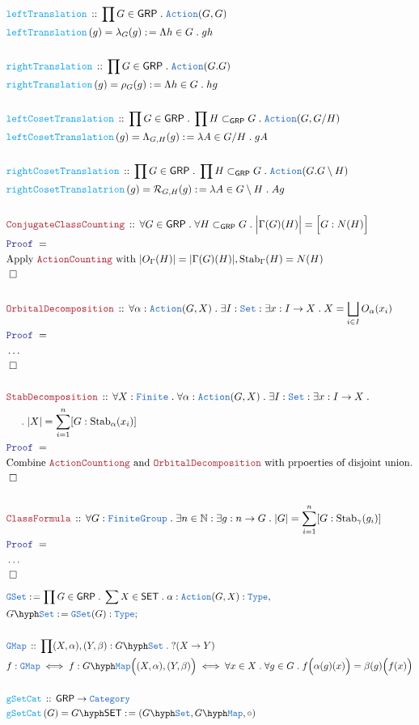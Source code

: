 \documentclass[12pt]{scrartcl}
\newcommand{\TYPE}[1]{\textcolor{NavyBlue}{\mathtt{#1}}}
\newcommand{\FUNC}[1]{\textcolor{Cerulean}{\mathtt{#1}}}
\newcommand{\LOGIC}[1]{\textcolor{Blue}{\mathtt{#1}}}
\newcommand{\THM}[1]{\textcolor{Maroon}{\mathtt{#1}}}
\renewcommand{\.}{\; . \;}
\newcommand{\de}{: \kern 0.1pc =}
\newcommand{\Act}[1]{\left( #1 \right)}
\newcommand{\Theorem}[2]{& \THM{#1} \, :: \, #2 \\ & \Proof = \\ }
\newcommand{\DeclareType}[2]{& \TYPE{#1} \, :: \, #2 \\}
\newcommand{\DefineNamedType}[4]{& #1 : \TYPE{#2} \iff #3 \iff #4 \\}
\newcommand{\DeclareFunc}[2]{& \FUNC{#1} \, :: \, #2 \\}
\newcommand{\DefineNamedFunc}[4]{&  \FUNC{#1}\Act{#2} = #3 \de #4 \\}
\newcommand{\NewLine}{\\ & \kern 1pc}
\newcommand{\Page}[1]{ \begin{align*} #1 \end{align*}   }
\newcommand{\NoProof}{ & \ldots \\ \EndProof}
\newcommand{\Type}{\TYPE{Type}}
\newcommand{\Nat}{\mathbb{N} }
\newcommand{\Cat}{\TYPE{Category}}
\newcommand{\Set}{\TYPE{Set}}
\newcommand{\Say}[3]{& #1 \de #2 : #3, \\}
\newcommand{\Conclude}[3]{& #1 \de #2 : #3; \\}
\newcommand{\QED}{\; \square}
\newcommand{\EndProof}{& \QED \\}
\newcommand{\Proof}{\LOGIC{Proof} \; }
\newcommand{\SET}{\mathsf{SET}}
\newcommand{\Sgrp}{\subset_{\mathsf{GRP}}}
\newcommand{\FG}{\TYPE{FiniteGroup}}
\newcommand{\Stab}{\mathrm{Stab}}
\newcommand{\GRP}{\mathsf{GRP}}
\begin{document}
\Page{
	\DeclareFunc{leftTranslation}{\prod G \in \GRP \. \TYPE{Action}(G,G)}
	\DefineNamedFunc{leftTranslation}{g}{\lambda_G(g)}{\Lambda h \in G \. gh}
	\\
	\DeclareFunc{rightTranslation}{\prod G \in \GRP \. \TYPE{Action}(G.G)}
	\DefineNamedFunc{rightTranslation}{g}{\rho_G(g)}{\Lambda h \in G \. hg }
	\\
	\DeclareFunc{leftCosetTranslation}{\prod G \in \GRP \. \prod H \Sgrp G \. \TYPE{Action}(G,G/H)}
	\DefineNamedFunc{leftCosetTranslation}{g}{\Lambda_{G,H}(g)}{\lambda A \in G/H \. gA}
	\\
	\DeclareFunc{rightCosetTranslation}{\prod G \in \GRP \. \prod H \Sgrp G \. \TYPE{Action}(G.G\setminus H)}
	\DefineNamedFunc{rightCosetTranslatrion}{g}{\mathcal{R}_{G,H}(g)}{\lambda A \in G \setminus H \. Ag}
	\\
	\Theorem{ConjugateClassCounting}{\forall G \in \GRP \. \forall H \Sgrp G \.  
		\Big|\Gamma(G)(H)\Big| = \Big[G : N(H)\Big]  }
	& \text{Apply $\THM{ActionCounting}$ with $ |O_\Gamma(H)| = |\Gamma(G)(H)|,  \Stab_\Gamma(H) = N(H)$}\\
	\EndProof
	\\
	\Theorem{OrbitalDecomposition}{\forall \alpha : \TYPE{Action}(G,X) \. \exists I : \Set : \exists x : I \to X \.  
		 X = \bigsqcup_{i \in I} O_\alpha(x_i)
	}
	\NoProof
	\\
	\Theorem{StabDecomposition}{\forall X : \TYPE{Finite} \. \forall  \alpha : \TYPE{Action}(G,X) \. \exists I : \Set
	: \exists x : I \to X \. \NewLine \. |X| = \sum^n_{i=1} [G : \Stab_\alpha(x_i)]}
	& \text{Combine $\THM{ActionCountiong}$ and $\THM{OrbitalDecomposition}$ with prpoerties of disjoint union.}\\
	\EndProof
	\\
	\Theorem{ClassFormula}{\forall G : \FG \. \exists n \in \Nat : \exists g : n \to G \. 
		|G| = \sum^n_{i=1}[ G : \Stab_\gamma(g_i) ]} 
	\NoProof
}\Page{
	\Say{\TYPE{GSet}}{\prod G \in \GRP \. \sum X \in \SET \. \alpha : \TYPE{Action}(G,X)}{\Type}
	\Conclude{G \hyph \Set}{\TYPE{GSet}(G)}{\Type}
	\\
	\DeclareType{GMap}{\prod (X,\alpha),(Y,\beta) : G\hyph\Set \. ?(X \to Y) }
	\DefineNamedType{f}{GMap}{f : G\hyph\TYPE{Map}\Big((X,\alpha),(Y,\beta)\Big)}
	{ \forall x \in X \. \forall g \in G \. f\Big( \alpha(g)(x) \Big) = \beta(g)\Big( f(x) \Big) }
	\\
	\DeclareFunc{gSetCat}{\GRP \to \Cat}
	\DefineNamedFunc{gSetCat}{G}{G\hyph\SET}{(G\hyph\Set , G\hyph\TYPE{Map}, \circ)}
}
\newpage
\end{document}
